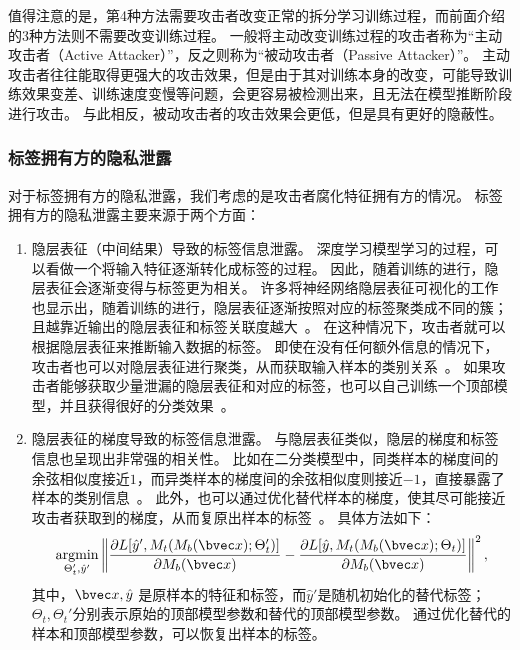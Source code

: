 值得注意的是，第4种方法需要攻击者改变正常的拆分学习训练过程，而前面介绍的3种方法则不需要改变训练过程。
%
一般将主动改变训练过程的攻击者称为“主动攻击者（Active Attacker）”，反之则称为“被动攻击者（Passive Attacker）”。
%
主动攻击者往往能取得更强大的攻击效果，但是由于其对训练本身的改变，可能导致训练效果变差、训练速度变慢等问题，会更容易被检测出来，且无法在模型推断阶段进行攻击。
与此相反，被动攻击者的攻击效果会更低，但是具有更好的隐蔽性。

\subsubsection{标签拥有方的隐私泄露}
对于标签拥有方的隐私泄露，我们考虑的是攻击者腐化特征拥有方的情况。
%
标签拥有方的隐私泄露主要来源于两个方面：
\begin{enumerate}[label=(\arabic*)]
    \item 隐层表征（中间结果）导致的标签信息泄露。
    深度学习模型学习的过程，可以看做一个将输入特征逐渐转化成标签的过程。
    因此，随着训练的进行，隐层表征会逐渐变得与标签更为相关。
    许多将神经网络隐层表征可视化的工作也显示出，随着训练的进行，隐层表征逐渐按照对应的标签聚类成不同的簇；且越靠近输出的隐层表征和标签关联度越大~\cite{paulo2017visualize_hidden,pezzotti2017deepeyes,cantareira2020hidden_vector_fields}。
    在这种情况下，攻击者就可以根据隐层表征来推断输入数据的标签。
    即使在没有任何额外信息的情况下，攻击者也可以对隐层表征进行聚类，从而获取输入样本的类别关系~\cite{liujunlin2022clustering_attack,liujunlin2023distance_attack}。
    如果攻击者能够获取少量泄漏的隐层表征和对应的标签，也可以自己训练一个顶部模型，并且获得很好的分类效果~\cite{fucong2022label_infer_attack}。
    \item 隐层表征的梯度导致的标签信息泄露。
    与隐层表征类似，隐层的梯度和标签信息也呈现出非常强的相关性。
    比如在二分类模型中，同类样本的梯度间的余弦相似度接近$1$，而异类样本的梯度间的余弦相似度则接近$-1$，直接暴露了样本的类别信息~\cite{oscarli2022label_defense_marvell}。
    此外，也可以通过优化替代样本的梯度，使其尽可能接近攻击者获取到的梯度，从而复原出样本的标签~\cite{erdogan2022unsplit}。
    具体方法如下：
    \begin{equation}
        \mathop{\text{argmin}}_{\Theta_t', \hat y'} \left\Vert \dfrac{\partial L[\hat y', M_t(M_b(\bvec x);\Theta_t')]}{\partial M_b(\bvec x)} - \dfrac{\partial L[\hat y, M_t(M_b(\bvec x);\Theta_t)]}{\partial M_b(\bvec x)} \right\Vert^2,
    \end{equation}
    其中，$\bvec x, \hat y$ 是原样本的特征和标签，而$\hat y'$是随机初始化的替代标签；$\Theta_t, \Theta_t'$分别表示原始的顶部模型参数和替代的顶部模型参数。
    通过优化替代的样本和顶部模型参数，可以恢复出样本的标签。
\end{enumerate}


